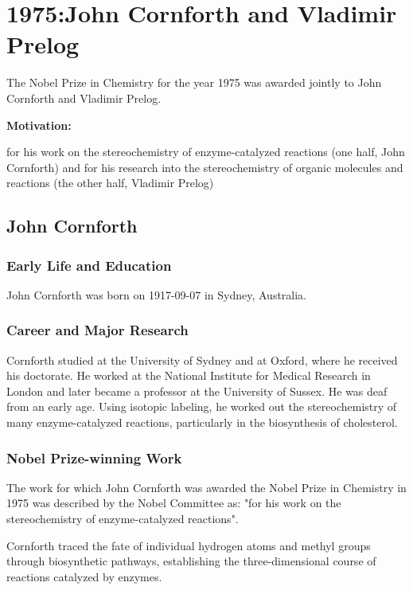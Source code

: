 \chapter{1975:John Cornforth and Vladimir Prelog}

\label{chap:chemistry1975}

The Nobel Prize in Chemistry for the year 1975 was awarded jointly to John Cornforth and Vladimir Prelog.

\textbf{Motivation:}

for his work on the stereochemistry of enzyme-catalyzed reactions (one half, John Cornforth) and for his research into the stereochemistry of organic molecules and reactions (the other half, Vladimir Prelog)

\section{John Cornforth}

\subsection*{Early Life and Education}

John Cornforth was born on 1917-09-07 in Sydney, Australia.

\subsection*{Career and Major Research}

Cornforth studied at the University of Sydney and at Oxford, where he received his doctorate. He worked at the National Institute for Medical Research in London and later became a professor at the University of Sussex. He was deaf from an early age. Using isotopic labeling, he worked out the stereochemistry of many enzyme-catalyzed reactions, particularly in the biosynthesis of cholesterol.

\subsection*{Nobel Prize-winning Work}

The work for which John Cornforth was awarded the Nobel Prize in Chemistry in 1975 was described by the Nobel Committee as: "for his work on the stereochemistry of enzyme-catalyzed reactions".

Cornforth traced the fate of individual hydrogen atoms and methyl groups through biosynthetic pathways, establishing the three-dimensional course of reactions catalyzed by enzymes.

